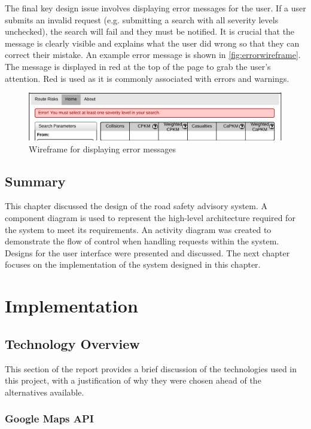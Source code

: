 \documentclass[authoryearcitations]{UoYCSproject}
\begin{document}
The final key design issue involves displaying error messages for the user. If a user submits an invalid request (e.g. submitting a search with all severity levels unchecked), the search will fail and they must be notified. It is crucial that the message is clearly visible and explains what the user did wrong so that they can correct their mistake. An example error message is shown in \autoref{fig:errorwireframe}. The message is displayed in red at the top of the page to grab the user's attention. Red is used as it is commonly associated with errors and warnings.

\begin{figure}
	\center
	\includegraphics[scale=0.8]{ErrorWireframe}
	\caption{Wireframe for displaying error messages}
	\label{fig:errorwireframe}
\end{figure}

\section{Summary}

This chapter discussed the design of the road safety advisory system. A component diagram is used to represent the high-level architecture required for the system to meet its requirements. An activity diagram was created to demonstrate the flow of control when handling requests within the system. Designs for the user interface were presented and discussed. The next chapter focuses on the implementation of the system designed in this chapter.

\chapter{Implementation}

\section{Technology Overview}

This section of the report provides a brief discussion of the technologies used in this project, with a justification of why they were chosen ahead of the alternatives available.

\subsection{Google Maps API}
\end{document}
